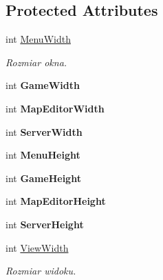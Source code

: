 \subsection*{Protected Attributes}
\begin{DoxyCompactItemize}
\item 
\mbox{\label{classtfp_1_1_screen_a68859ed29c3e240fac1fca0920faeb5d}} 
int \mbox{\hyperlink{classtfp_1_1_screen_a68859ed29c3e240fac1fca0920faeb5d}{Menu\+Width}}
\begin{DoxyCompactList}\small\item\em Rozmiar okna. \end{DoxyCompactList}\item 
\mbox{\label{classtfp_1_1_screen_a82692b112df068cf9ef727ca4cadc200}} 
int {\bfseries Game\+Width}
\item 
\mbox{\label{classtfp_1_1_screen_a6599cdf153a9ccfd09d995dd26b421ec}} 
int {\bfseries Map\+Editor\+Width}
\item 
\mbox{\label{classtfp_1_1_screen_aa51f63d08fbded7e11c418012692fb0e}} 
int {\bfseries Server\+Width}
\item 
\mbox{\label{classtfp_1_1_screen_a468f094b9a0cd31767321773ff4ba312}} 
int {\bfseries Menu\+Height}
\item 
\mbox{\label{classtfp_1_1_screen_a858c0dcb6d1da77e3f70743c18629c73}} 
int {\bfseries Game\+Height}
\item 
\mbox{\label{classtfp_1_1_screen_a40a8c425ef0dc280bdd0c5eac03971d5}} 
int {\bfseries Map\+Editor\+Height}
\item 
\mbox{\label{classtfp_1_1_screen_a9849da02386c868319f57a779caa6d11}} 
int {\bfseries Server\+Height}
\item 
\mbox{\label{classtfp_1_1_screen_a67b21d9e724e9ba8b6e58fc50a88d168}} 
int \mbox{\hyperlink{classtfp_1_1_screen_a67b21d9e724e9ba8b6e58fc50a88d168}{View\+Width}}
\begin{DoxyCompactList}\small\item\em Rozmiar widoku. \end{DoxyCompactList}\item 

\end{DoxyCompactItemize}
